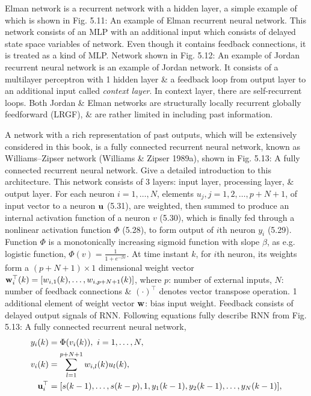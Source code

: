 \documentclass{article}
\begin{document}
\begin{enumerate}
\begin{itemize}
\begin{itemize}
			Elman network is a recurrent network with a hidden layer, a simple example of which is shown in {\sf Fig. 5.11: An example of Elman recurrent neural network}. This network consists of an MLP with an additional input which consists of delayed state space variables of network. Even though it contains feedback connections, it is treated as a kind of MLP. Network shown in {\sf Fig. 5.12: An example of Jordan recurrent neural network} is an example of Jordan network. It consists of a multilayer perceptron with 1 hidden layer \& a feedback loop from output layer to an additional input called {\it context layer}. In context layer, there are self-recurrent loops. Both Jordan \& Elman networks are structurally locally recurrent globally feedforward (LRGF), \& are rather limited in including past information.
			
			A network with a rich representation of past outputs, which will be extensively considered in this book, is a fully connected recurrent neural network, known as Williams--Zipser network (Williams \& Zipser 1989a), shown in {\sf Fig. 5.13: A fully connected recurrent neural network}. Give a detailed introduction to this architecture. This network consists of 3 layers: input layer, processing layer, \& output layer. For each neuron $i = 1,\ldots,N$, elements $u_j,j = 1,2,\ldots,p + N + 1$, of input vector to a neuron ${\bf u}$ (5.31), are weighted, then summed to produce an internal activation function of a neuron $v$ (5.30), which is finally fed through a nonlinear activation function $\Phi$ (5.28), to form output of $i$th neuron $y_i$ (5.29). Function $\Phi$ is a monotonically increasing sigmoid function with slope $\beta$, as e.g. logistic function, $\Phi(v) = \frac{1}{1 + e^{-\beta v}}$. At time instant $k$, for $i$th neuron, its weights form a $(p + N + 1)\times1$ dimensional weight vector ${\bf w}_i^\top(k) = [w_{i,1}(k),\ldots,w_{i,p + N + 1}(k)]$, where $p$: number of external inputs, $N$: number of feedback connections \& $(\cdot)^\top$ denotes vector transpose operation. 1 additional element of weight vector ${\bf w}$: bias input weight. Feedback consists of delayed output signals of RNN. Following equations fully describe RNN from {\sf Fig. 5.13: A fully connected recurrent neural network},
			\begin{align}
				y_i(k) &= \Phi(v_i(k)),\ i = 1,\ldots,N,\\
				v_i(k) &= \sum_{l=1}^{p + N + 1} w_{i,l}(k)u_l(k),\\
				{\bf u}_i^\top &= [s(k - 1),\ldots,s(k - p),1,y_1(k - 1),y_2(k - 1),\ldots,y_N(k - 1)],

\end{align}
\end{itemize}
\end{itemize}
\end{enumerate}
\end{document}

